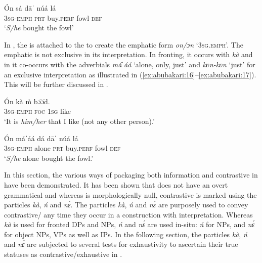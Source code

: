 \documentclass[output=paper,modfonts,nonflat,
\ChapterDOI{10.5281/zenodo.3367154}
 hidelinks
]{langsci/langscibook}
\begin{document}
 
\ea\label{ex:abubakari:15}  
\gll \'{O}n    sá  dāˈ    núá  lá\\
3\textsc{sg}-\textsc{emph}  \textsc{prt}  buy.\textsc{perf}  fowl  \textsc{def}\\
\glt ‘\textit{S/he} bought the fowl’    
\z 

In , the  is attached to the  to create the emphatic form \textit{on/ɔn} ‘3\textsc{sg}.\textsc{emph}’. The emphatic  is not exclusive in its interpretation. In fronting, it occurs with \textit{kà} and in  it co-occurs with the adverbials \textit{máˈáá} ‘alone, only, just’ and \textit{kʋn-kʋn} ‘just’ for an exclusive interpretation as illustrated in (\ref{ex:abubakari:16}--\ref{ex:abubakari:17}). This will be further discussed in .

 
\ea\label{ex:abubakari:16} 
\gll \'{O}n    kà  \`{m}  bɔ̄ɔ̄d.\\
3\textsc{sg}-\textsc{emph}  \textsc{foc}  1\textsc{sg}  like\\
\glt ‘It is \textit{him/her} that I like (not any other person).’
\z
 
\ea\label{ex:abubakari:17} 
\gll \'{O}n    máˈáá  dá  dāˈ    núá  lá\\
3\textsc{sg}-\textsc{emph}  alone  \textsc{prt}  buy.\textsc{perf}  fowl  \textsc{def}\\
\glt ‘\textit{S/he} alone bought the fowl.’
\z

 
In this section, the various ways of packaging both information and contrastive  in  have been demonstrated. It has been shown that  does not have an overt grammatical  and whereas  is morphologically null, contrastive  is marked using the particles \textit{kà}, \textit{ń} and \textit{nɛ́}. The particles \textit{kà}, \textit{ń} and \textit{nɛ́} are purposely used to convey contrastive{\slash} any time they occur in a construction with  interpretation. Whereas \textit{kà} is used for fronted DPs and NPs, \textit{ń} and \textit{nɛ́} are used in-situ: \textit{ń} for  NPs, and \textit{nɛ́} for object NPs, VPs as well as IPs. In the following section, the particles \textit{kà}, \textit{ń} and \textit{nɛ́} are subjected to several tests for exhaustivity to ascertain their true statuses as contrastive{\slash}exhaustive  in .
 
\end{document}
